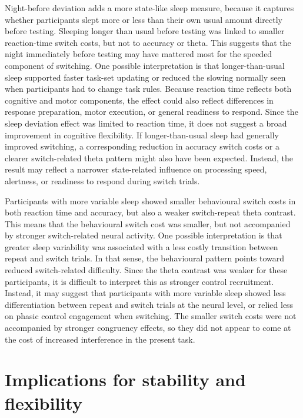 \documentclass[12pt,a4paper]{report}
\begin{document}
Night-before deviation adds a more state-like sleep measure, because it captures whether participants slept more or less than their own usual amount directly before testing. Sleeping longer than usual before testing was linked to smaller reaction-time switch costs, but not to accuracy or theta. This suggests that the night immediately before testing may have mattered most for the speeded component of switching. One possible interpretation is that longer-than-usual sleep supported faster task-set updating or reduced the slowing normally seen when participants had to change task rules. Because reaction time reflects both cognitive and motor components, the effect could also reflect differences in response preparation, motor execution, or general readiness to respond. Since the sleep deviation effect was limited to reaction time, it does not suggest a broad improvement in cognitive flexibility. If longer-than-usual sleep had generally improved switching, a corresponding reduction in accuracy switch costs or a clearer switch-related theta pattern might also have been expected. Instead, the result may reflect a narrower state-related influence on processing speed, alertness, or readiness to respond during switch trials.

Participants with more variable sleep showed smaller behavioural switch costs in both reaction time and accuracy, but also a weaker switch-repeat theta contrast. This means that the behavioural switch cost was smaller, but not accompanied by stronger switch-related neural activity. One possible interpretation is that greater sleep variability was associated with a less costly transition between repeat and switch trials. In that sense, the behavioural pattern points toward reduced switch-related difficulty. Since the theta contrast was weaker for these participants, it is difficult to interpret this as stronger control recruitment. Instead, it may suggest that participants with more variable sleep showed less differentiation between repeat and switch trials at the neural level, or relied less on phasic control engagement when switching. The smaller switch costs were not accompanied by stronger congruency effects, so they did not appear to come at the cost of increased interference in the present task.


\section{Implications for stability and flexibility}
\end{document}
